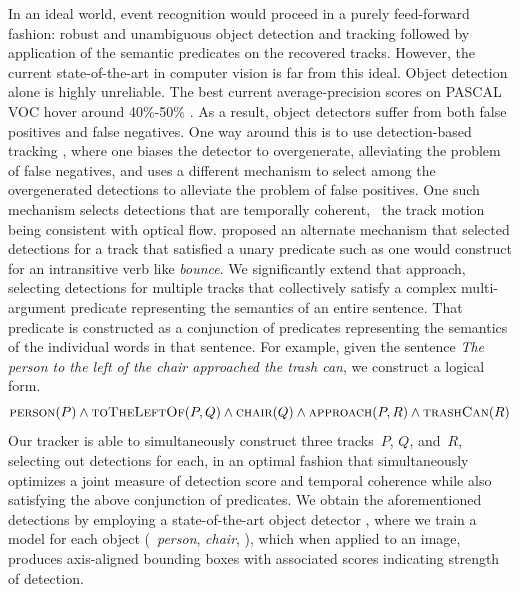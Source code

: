 In an ideal world, event recognition would proceed in a purely feed-forward
fashion: robust and unambiguous object detection and tracking followed by
application of the semantic predicates on the recovered tracks.
%
However, the current state-of-the-art in computer vision is far from this
ideal.
%
Object detection alone is highly unreliable.
%
The best current average-precision scores on PASCAL VOC hover around 40\%-50\%
\citep{Everingham10}.
%
As a result, object detectors suffer from both false positives and false
negatives.
%
One way around this is to use detection-based tracking \citep{Wolf1989}, where
one biases the detector to overgenerate, alleviating the problem of false
negatives, and uses a different mechanism to select among the overgenerated
detections to alleviate the problem of false positives.
%
One such mechanism selects detections that are temporally coherent, \ie\ the
track motion being consistent with optical flow.
%
\cite{Barbu2012b} proposed an alternate mechanism that selected detections for
a track that satisfied a unary predicate such as one would construct for an
intransitive verb like \emph{bounce}.
%
We significantly extend that approach, selecting detections for multiple tracks
that collectively satisfy a complex multi-argument predicate representing the
semantics of an entire sentence.
%
That predicate is constructed as a conjunction of predicates representing the
semantics of the individual words in that sentence.
%
For example, given the sentence \emph{The person to the left of the chair
  approached the trash can}, we construct a logical form.
%
\begin{equation*}
  \textsc{person}(P)\wedge
  \textsc{toTheLeftOf}(P,Q)\wedge
  \textsc{chair}(Q)\wedge
  \textsc{approach}(P,R)\wedge
  \textsc{trashCan}(R)
\end{equation*}
%
Our tracker is able to simultaneously construct three tracks~$P$, $Q$, and~$R$,
selecting out detections for each, in an optimal fashion that simultaneously
optimizes a joint measure of detection score and temporal coherence while also
satisfying the above conjunction of predicates.
%
We obtain the aforementioned detections by employing a state-of-the-art object
detector \citep{Felzenszwalb2010b}, where we train a model for each object
(\eg\ \emph{person}, \emph{chair}, \etc), which when applied to an image,
produces axis-aligned bounding boxes with associated scores indicating strength
of detection.

